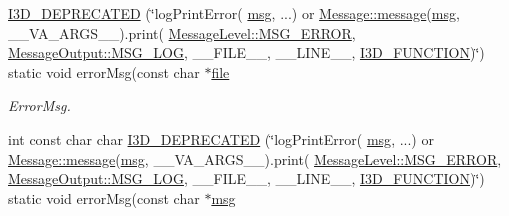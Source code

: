 \begin{DoxyCompactItemize}
\hyperlink{class_i3_d_1_1_log_msg_a3c42ac3ea1b9ceda209394a4181394cf}{I3\+D\+\_\+\+D\+E\+P\+R\+E\+C\+A\+T\+ED} (\char`\"{}log\+Print\+Error( \hyperlink{class_i3_d_1_1_log_msg_a5a1ceb27d9529de8eb9b3fc9377e178a}{msg}, ...) or \hyperlink{class_i3_d_1_1_message_a525f877a41a1e7493188b2b720d1d254}{Message\+::message}(\hyperlink{class_i3_d_1_1_log_msg_a5a1ceb27d9529de8eb9b3fc9377e178a}{msg}, \+\_\+\+\_\+\+V\+A\+\_\+\+A\+R\+G\+S\+\_\+\+\_\+).print( \hyperlink{namespace_i3_d_a1c1740d2076e09b1a37b82e45a0327b5a5c89a276ac7877e1de49cdc1b4750ce4}{Message\+Level\+::\+M\+S\+G\+\_\+\+E\+R\+R\+OR}, \hyperlink{namespace_i3_d_a2ccb65ac6e08844c1175a235107fa103a8c1a4761ebfadb227927517230ff7b02}{Message\+Output\+::\+M\+S\+G\+\_\+\+L\+OG}, \+\_\+\+\_\+\+F\+I\+L\+E\+\_\+\+\_\+, \+\_\+\+\_\+\+L\+I\+N\+E\+\_\+\+\_\+, \hyperlink{defs_8h_acd64dca6972802e8d77a78d3efcca04a}{I3\+D\+\_\+\+F\+U\+N\+C\+T\+I\+ON})\char`\"{}) static void error\+Msg(const char $\ast$\hyperlink{class_i3_d_1_1_log_msg_ab59f20d39ef112d2196371ae0636d77c}{file}
\begin{DoxyCompactList}\small\item\em Error\+Msg. \end{DoxyCompactList}\item 
int const char char \hyperlink{class_i3_d_1_1_log_msg_a61423345a1ce5d116c573bf7e6d7e1c5}{I3\+D\+\_\+\+D\+E\+P\+R\+E\+C\+A\+T\+ED} (\char`\"{}log\+Print\+Error( \hyperlink{class_i3_d_1_1_log_msg_a5a1ceb27d9529de8eb9b3fc9377e178a}{msg}, ...) or \hyperlink{class_i3_d_1_1_message_a525f877a41a1e7493188b2b720d1d254}{Message\+::message}(\hyperlink{class_i3_d_1_1_log_msg_a5a1ceb27d9529de8eb9b3fc9377e178a}{msg}, \+\_\+\+\_\+\+V\+A\+\_\+\+A\+R\+G\+S\+\_\+\+\_\+).print( \hyperlink{namespace_i3_d_a1c1740d2076e09b1a37b82e45a0327b5a5c89a276ac7877e1de49cdc1b4750ce4}{Message\+Level\+::\+M\+S\+G\+\_\+\+E\+R\+R\+OR}, \hyperlink{namespace_i3_d_a2ccb65ac6e08844c1175a235107fa103a8c1a4761ebfadb227927517230ff7b02}{Message\+Output\+::\+M\+S\+G\+\_\+\+L\+OG}, \+\_\+\+\_\+\+F\+I\+L\+E\+\_\+\+\_\+, \+\_\+\+\_\+\+L\+I\+N\+E\+\_\+\+\_\+, \hyperlink{defs_8h_acd64dca6972802e8d77a78d3efcca04a}{I3\+D\+\_\+\+F\+U\+N\+C\+T\+I\+ON})\char`\"{}) static void error\+Msg(const char $\ast$\hyperlink{class_i3_d_1_1_log_msg_a5a1ceb27d9529de8eb9b3fc9377e178a}{msg}
\end{DoxyCompactItemize}
